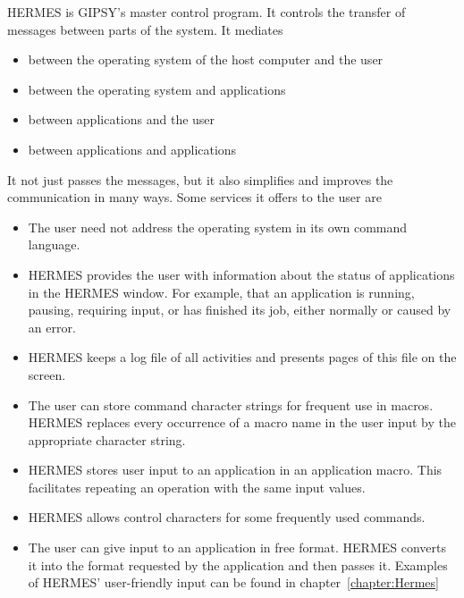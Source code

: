 HERMES is GIPSY's master control program.  It controls the transfer of
messages between parts of the system.  It mediates

\begin{itemize}

\item between the operating system of the host computer and the user

\item between the operating system and applications

\item between applications and the user

\item between applications and applications

\end{itemize}

It not just passes the messages, but it also simplifies and improves the
communication in many ways.  Some services it offers to the user are

\begin{itemize}

\item The user need not address the operating system in its own command
language. 

\item HERMES provides the user with information about the status of
applications in the HERMES window.  For example, that an application is
running, pausing, requiring input, or has finished its job, either
normally or caused by an error. 

\item HERMES keeps a log file of all activities and presents pages of
this file on the screen. 

\item The user can store command character strings for frequent use in
macros.  HERMES replaces every occurrence of a macro name in the user
input by the appropriate character string. 

\item HERMES stores user input to an application in an application
macro.  This facilitates repeating an operation with the same input
values. 

\item HERMES allows control characters for some frequently used commands.

\item The user can give input to an application in free format.  HERMES
converts it into the format requested by the application and then passes
it.  Examples of HERMES' user-friendly input can be found in chapter~\ref{chapter:Hermes}

\end{itemize}

